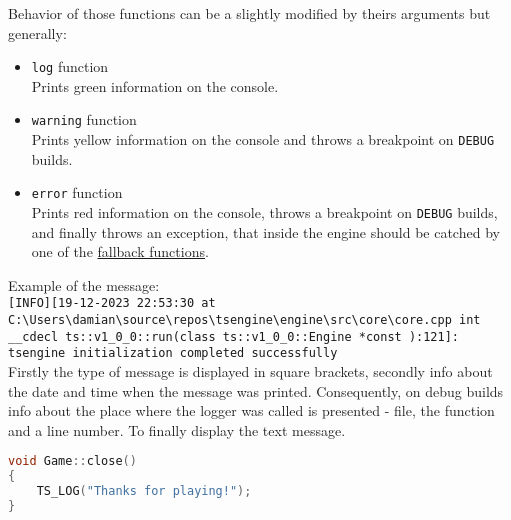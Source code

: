 Behavior of those functions can be a slightly modified by theirs arguments but generally:
\begin{itemize}
    \item \texttt{log} function\\
    Prints green information on the console.
    \item \texttt{warning} function\\ 
    Prints yellow information on the console and throws a breakpoint on \texttt{DEBUG} builds.
    \item \texttt{error} function\\
    Prints red information on the console, throws a breakpoint on \texttt{DEBUG} builds, and finally throws an exception, that inside the engine should be catched by one of the \hyperref[sec:fallbacks]{fallback functions}.
\end{itemize}

Example of the message:\\
\texttt{[INFO][19-12-2023 22:53:30 at C:\textbackslash Users\textbackslash damian\textbackslash source\textbackslash repos\textbackslash tsengine\textbackslash engine\textbackslash src\textbackslash core\textbackslash core.cpp int \_\_cdecl ts::v1\_0\_0::run(class ts::v1\_0\_0::Engine *const ):121]: tsengine initialization completed successfully}\\

Firstly the type of message is displayed in square brackets, secondly info about the date and time when the message was printed. Consequently, on debug builds info about the place where the logger was called is presented - file, the function and a line number. To finally display the text message. 

\begin{lstlisting}[language=c++, caption=An example of the logger message(./engine/include/tsengine/logger.h)]
void Game::close()
{
    TS_LOG("Thanks for playing!");
}
\end{lstlisting}